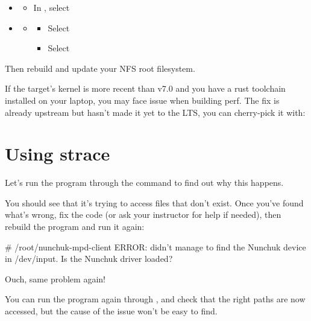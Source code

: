 \begin{itemize}
\item {}
  \begin{itemize}
  \item In , select 
  \end{itemize}
\item {} 
  \begin{itemize}
  \item {}
    \begin{itemize}
    \item Select 
    \item Select 
    \end{itemize}
  \end{itemize}
\end{itemize}

Then rebuild and update your NFS root filesystem.

If the target's kernel is more recent than v7.0 and you have a rust toolchain
installed on your laptop, you may face issue when building perf. The fix is
already upstream but hasn't made it yet to the LTS, you can cherry-pick it with:

\section{Using strace}

Let's run the program through the  command to find out why
this happens.

You should see that it's trying to access files that don't exist.
Once you've found what's wrong, fix the code (or ask your instructor for
help if needed), then rebuild the program and run it again:

\begin{bashinput}
# /root/nunchuk-mpd-client
ERROR: didn't manage to find the Nunchuk device in /dev/input. Is the Nunchuk driver loaded?
\end{bashinput}

Ouch, same problem again!

You can run the program again through , and check that the
right paths are now accessed, but the cause of the issue won't be easy
to find.


